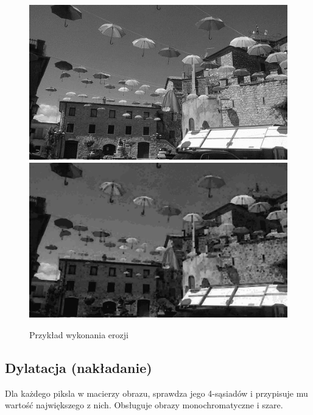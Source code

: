 \documentclass{article}
\begin{document}
\begin{figure}[!ht]
	\includegraphics[scale=1.2]{img/gray-obraz1}
	\includegraphics[scale=0.288]{img/morfologiczne/erozja-gray}
	\caption{Przykład wykonania erozji}
	\label{fig17}	
	\end{figure}	
	
	
	\subsection{Dylatacja (nakładanie)}
	Dla każdego piksla w macierzy obrazu, sprawdza jego 4-sąsiadów i przypisuje mu wartość największego z nich.
	Obsługuje obrazy monochromatyczne i szare.
	
\end{document}
